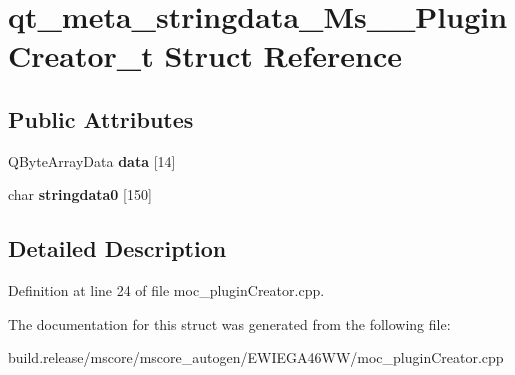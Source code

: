 \hypertarget{structqt__meta__stringdata___ms_____plugin_creator__t}{}\section{qt\+\_\+meta\+\_\+stringdata\+\_\+\+Ms\+\_\+\+\_\+\+Plugin\+Creator\+\_\+t Struct Reference}
\label{structqt__meta__stringdata___ms_____plugin_creator__t}
\subsection*{Public Attributes}
\begin{DoxyCompactItemize}
\item 
\mbox{\label{structqt__meta__stringdata___ms_____plugin_creator__t_a2365914b5d67d90a3411b28ad3eb9d55}} 
Q\+Byte\+Array\+Data {\bfseries data} \mbox{[}14\mbox{]}
\item 
\mbox{\label{structqt__meta__stringdata___ms_____plugin_creator__t_af0fdcb1cde007ab332f299e313e96a4c}} 
char {\bfseries stringdata0} \mbox{[}150\mbox{]}
\end{DoxyCompactItemize}


\subsection{Detailed Description}


Definition at line 24 of file moc\+\_\+plugin\+Creator.\+cpp.



The documentation for this struct was generated from the following file\+:\begin{DoxyCompactItemize}
\item 
build.\+release/mscore/mscore\+\_\+autogen/\+E\+W\+I\+E\+G\+A46\+W\+W/moc\+\_\+plugin\+Creator.\+cpp\end{DoxyCompactItemize}
